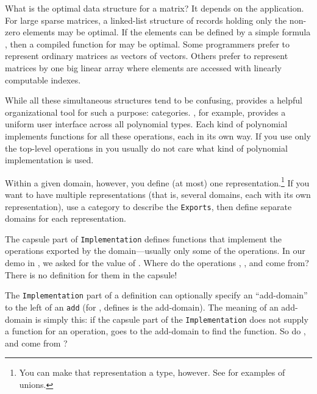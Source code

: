{{{{{{{What is the optimal data structure for a matrix?
It depends on the application.
For large sparse matrices, a linked-list structure of records
holding only the non-zero elements may be optimal.
If the elements can be defined by a simple formula
, then a compiled function for
 may be optimal.
Some programmers prefer to represent ordinary matrices as vectors
of vectors.
Others prefer to represent matrices by one big linear array where
elements are accessed with linearly computable indexes.

While all these simultaneous structures tend to be confusing,
\Language{} provides a helpful organizational tool for such a purpose:
categories.
, for example, provides a uniform user
interface across all polynomial types.
Each kind of polynomial implements functions for
all these operations, each in its own way.
If you use only the top-level operations in
 you usually do not care what kind
of polynomial implementation is used.

Within a given domain, however, you define (at most) one
representation.\footnote{You can make that representation a
 type, however.
See  for examples of unions.}
If you want to have multiple representations (that is, several
domains, each with its own representation), use a category to
describe the {\tt Exports}, then define separate domains for each
representation.

%

The capsule part of {\tt Implementation} defines functions that
implement the operations exported by the domain---usually only
some of the operations.
In our demo in , we asked for the value of
.
Where do the operations \spadop{*}, \spadop{+}, and
\spadop{-} come from?
There is no definition for them in the capsule!

The {\tt Implementation} part of a definition can
optionally specify an ``add-domain'' to the left of an {\tt add}
(for , defines
 is the add-domain).
The meaning of an add-domain is simply this: if the capsule part
of the {\tt Implementation} does not supply a function for an
operation, \Language{} goes to the add-domain to find the
function.
So do , 
and  come from
?

}}}}}}}
